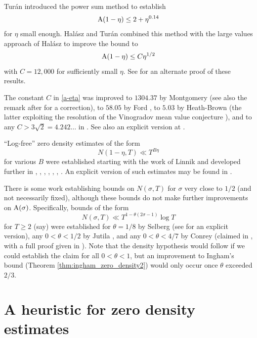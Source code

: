 Tur\'an \cite{turan} introduced the power sum method to establish
$$ \mathrm{A}(1-\eta) \leq 2 + \eta^{0.14}$$
for $\eta$ small enough. Hal\'asz and Tur\'an \cite{halasz_distribution_1969} combined this method with the large values approach of Hal\'asz \cite{halasz_1968} to improve the bound to
\begin{equation}\label{a-eta}
  \mathrm{A}(1-\eta) \leq C \eta^{1/2}
\end{equation}
with $C = 12,000$ for sufficiently small $\eta$.  See \cite{pintz_2022} for an alternate proof of these results.

The constant $C$ in \eqref{a-eta} was improved to $1304.37$ by Montgomery \cite[Theorem 12.3]{montgomery_topics_1971} (see also the remark after \cite[(11.97)]{ivic} for a correction), to $58.05$ by Ford \cite{FordZeta}, to $5.03$ by Heath-Brown \cite{heathbrown_new_2017} (the latter exploiting the resolution of the Vinogradov mean value conjecture \cite{bourgain_demeter_guth}), and to any $C > 3\sqrt{2}=4.242\dots$ in \cite{pintz_density_2023}. See also an explicit version at \cite{bellotti}.

``Log-free'' zero density estimates of the form
$$ N(1-\eta,T) \ll T^{B\eta}$$
for various $B$ were established starting with the work of Linnik \cite{linnik-1,linnik-2} and developed further in \cite{turan}, \cite{fogels}, \cite{bombieri_1974}, \cite{jutila_linnik}, \cite{gallagher_large_sieve}, \cite{graham_1978}, \cite{heath_brown_least_prime}. An explicit version of such estimates may be found in \cite{bellotti_2024}.

There is some work establishing bounds on $N(\sigma,T)$ for $\sigma$ very close to $1/2$ (and not necessarily fixed), although these bounds do not make further improvements on $\mathrm{A}(\sigma)$.  Specifically, bounds of the form
$$ N(\sigma,T) \ll T^{1-\theta(2\sigma-1)} \log T$$
for $T \geq 2$ (say) were established for $\theta=1/8$ by Selberg \cite{selberg_1946} (see \cite{simonic} for an explicit version), any $0 < \theta < 1/2$ by Jutila \cite{jutila-critical}, and any $0 < \theta < 4/7$ by Conrey (claimed in \cite{conrey_at_1989}, with a full proof given in \cite{baluyot_thesis}).  Note that the density hypothesis would follow if we could establish the claim for all $0 < \theta < 1$, but an improvement to Ingham's bound (Theorem \ref{thm:ingham_zero_density2}) would only occur once $\theta$ exceeded $2/3$.

\section{A heuristic for zero density estimates}

